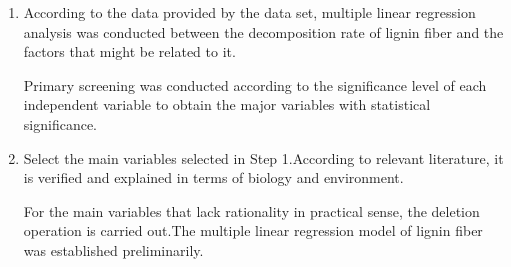 \documentclass[12pt]{article}
\begin{document}
\begin{enumerate}[\bfseries 1.]
	\item According to the data provided by the data set, multiple linear regression analysis was conducted between the decomposition rate of lignin fiber and the factors that might be related to it. \par 
	
	Primary screening was conducted according to the significance level of each independent variable to obtain the major variables with statistical significance.
	
	\item Select the main variables selected in Step 1.According to relevant literature, it is verified and explained in terms of biology and environment.\par 
	
	For the main variables that lack rationality in practical sense, the deletion operation is carried out.The multiple linear regression model of lignin fiber was established preliminarily.
\end{enumerate}\par






\end{document}
